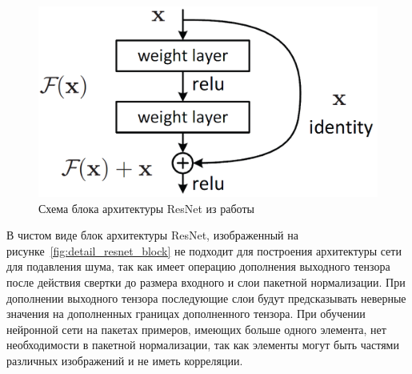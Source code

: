 \documentclass[14pt]{mmcs_article}
\begin{document}
\begin{figure}[H]
	\centering
	\includegraphics[scale=0.5]{img/resnet}
	\caption{Схема блока архитектуры ResNet из работы~\autocite{ResNetPaper}}
	\label{fig:resnet_block}
\end{figure}


В чистом виде блок архитектуры ResNet, изображенный на рисунке~\ref{fig:detail_resnet_block} не подходит для построения архитектуры сети для подавления шума, так как имеет операцию дополнения выходного тензора после действия свертки до размера входного и слои пакетной нормализации. При дополнении выходного тензора последующие слои будут предсказывать неверные значения на дополненных границах дополненного тензора. При обучении нейронной сети на пакетах примеров, имеющих больше одного элемента, нет необходимости в пакетной нормализации, так как элементы могут быть частями различных изображений и не иметь корреляции. 
\end{document}
